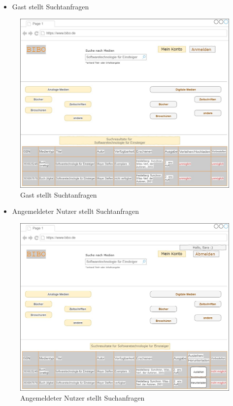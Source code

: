 \documentclass[12pt, a4paper]{article}
\begin{document}
\pagebreak
\begin{itemize}
	\item Gast stellt Suchtanfragen
\end{itemize}
\begin{figure}[h]
	\includegraphics[width=\textwidth]{GUIs/such_Gast.jpg}
	\caption{Gast stellt Suchtanfragen}
	\label{fig:suchtanfragen_gast}
\end{figure}
\pagebreak
\begin{itemize}
	\item Angemeldeter Nutzer stellt Suchtanfragen
\end{itemize}
\begin{figure}[h]
	\includegraphics[width=\textwidth]{GUIs/such_angemNutzer.jpg}
	\caption{Angemeldeter Nutzer stellt Suchanfragen}
	\label{fig:suchtanfragen_angem_nutzer}
\end{figure}
\end{document}
